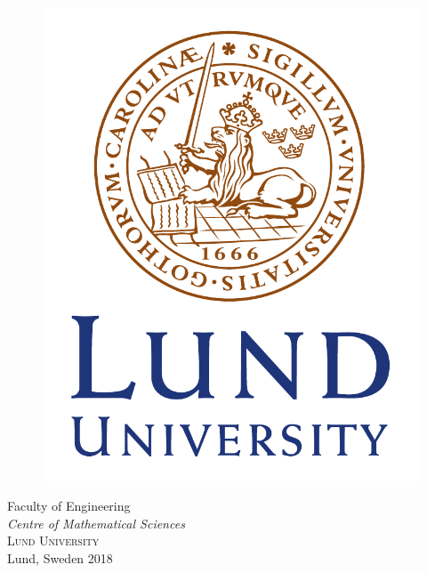\begin{titlepage}

\thispagestyle{empty}
\rmfamily
{}
\begin{center}
	\textsc{\large {}}\\[4cm]		%
	{\huge \spacedlowsmallcaps{\textbf{\myTitle}}} \\[0.5cm]
	{\huge \spacedlowsmallcaps{\textbf{\myTitletwo}}}
	\\[1cm]
	{\large \mySubTitle}\\[1cm]
	{\large \myNameFanny}\\
	{\large \myNameLina}
	
	\vfill	
	\begin{figure}[H]
	\centering
	\includegraphics[width=0.2\pdfpagewidth]{Figures/LundUniversity_C2line_CMYK_logo.pdf} \\
	\end{figure}	\vspace{5mm}	
	
	Faculty of Engineering \\
	\emph{Centre of Mathematical Sciences}\\
	\textsc{Lund University} \\
	Lund, Sweden 2018 \\
\end{center}


\end{titlepage}



